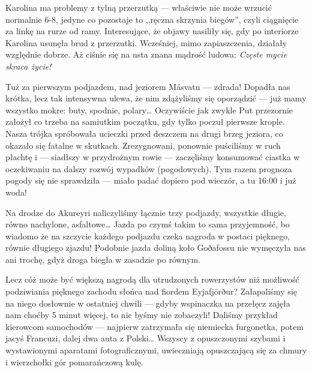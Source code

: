 
Karolina ma problemy z tylną przerzutką --- właściwie nie może wrzucić normalnie 6-8, jedyne co pozostaje to ,,ręczna skrzynia biegów'', czyli ciągnięcie za linkę na rurze od ramy. Interesujące, że objawy nasiliły się, gdy po interiorze Karolina usunęła brud z przerzutki. Wcześniej, mimo zapiaszczenia, działały względnie dobrze. Aż ciśnie się na usta znana mądrość ludowa: \emph{Częste mycie skraca życie!}

Tuż za pierwszym podjazdem, nad jeziorem Másvatn --- zdrada! Dopadła nas krótka, lecz tak intensywna ulewa, że nim zdążyliśmy się oporządzić --- już mamy wszystko mokre: buty, spodnie, polary… Oczywiście jak zwykle Put przezornie założył co trzeba na samiutkim początku, gdy tylko poczuł pierwsze krople. Nasza trójka spróbowała ucieczki przed deszczem na drugi brzeg jeziora, co okazało się  fatalne w skutkach. Zrezygnowani, ponownie puściliśmy w ruch płachtę i --- siadłszy w przydrożnym rowie --- zaczęliśmy konsumować ciastka w oczekiwaniu na dalszy rozwój wypadków (pogodowych). Tym razem prognoza pogody się nie sprawdziła --- miało padać dopiero pod wieczór, a tu 16:00 i już woda!

Na drodze do Akureyri naliczyliśmy łącznie trzy podjazdy, wszystkie długie, równo nachylone, asfaltowe… Jazda po czymś takim to sama przyjemność, bo wiadomo że na szczycie każdego podjazdu czeka nagroda w postaci pięknego, równie długiego zjazdu! Podobnie jazda doliną koło Goðafossu nie wymęczyła nas ani trochę, gdyż droga biegła w zasadzie po równym.

Lecz cóż może być większą nagrodą dla utrudzonych rowerzystów niż możliwość podziwiania pięknego zachodu słońca nad fiordem Eyjafjörður? Załapaliśmy się na niego dosłownie w ostatniej chwili --- gdyby wspinaczka na przełęcz zajęła nam choćby 5 minut więcej, to nic byśmy nie zobaczyli! Daliśmy przykład kierowcom samochodów --- najpierw zatrzymała się niemiecka furgonetka, potem jacyś Francuzi, dalej dwa auta z Polski… Wszyscy z opuszczonymi szybami i wystawionymi aparatami fotograficznymi, uwieczniają opuszczającą się za chmury i wierzchołki gór pomarańczową kulę.


